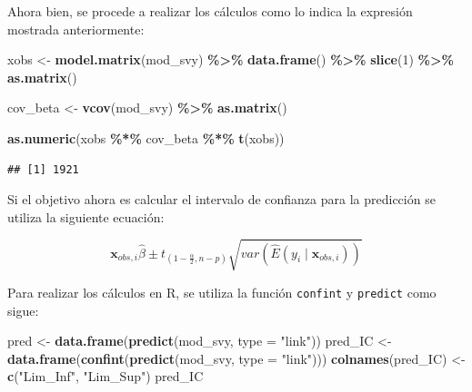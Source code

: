 \documentclass[
  12pt,
]{book}
\newenvironment{Shaded}{\begin{snugshade}}{\end{snugshade}}
\newcommand{\AttributeTok}[1]{\textcolor[rgb]{0.13,0.29,0.53}{#1}}
\newcommand{\DecValTok}[1]{\textcolor[rgb]{0.00,0.00,0.81}{#1}}
\newcommand{\FunctionTok}[1]{\textcolor[rgb]{0.13,0.29,0.53}{\textbf{#1}}}
\newcommand{\NormalTok}[1]{#1}
\newcommand{\OtherTok}[1]{\textcolor[rgb]{0.56,0.35,0.01}{#1}}
\newcommand{\SpecialCharTok}[1]{\textcolor[rgb]{0.81,0.36,0.00}{\textbf{#1}}}
\newcommand{\StringTok}[1]{\textcolor[rgb]{0.31,0.60,0.02}{#1}}
\begin{document}
Ahora bien, se procede a realizar los cálculos como lo indica la expresión mostrada anteriormente:

\begin{Shaded}
\begin{Highlighting}[]
\NormalTok{xobs }\OtherTok{\textless{}{-}} \FunctionTok{model.matrix}\NormalTok{(mod\_svy) }\SpecialCharTok{\%\textgreater{}\%}
        \FunctionTok{data.frame}\NormalTok{() }\SpecialCharTok{\%\textgreater{}\%} \FunctionTok{slice}\NormalTok{(}\DecValTok{1}\NormalTok{) }\SpecialCharTok{\%\textgreater{}\%} \FunctionTok{as.matrix}\NormalTok{()}

\NormalTok{cov\_beta }\OtherTok{\textless{}{-}} \FunctionTok{vcov}\NormalTok{(mod\_svy) }\SpecialCharTok{\%\textgreater{}\%} \FunctionTok{as.matrix}\NormalTok{()}

\FunctionTok{as.numeric}\NormalTok{(xobs }\SpecialCharTok{\%*\%}\NormalTok{ cov\_beta }\SpecialCharTok{\%*\%} \FunctionTok{t}\NormalTok{(xobs))}
\end{Highlighting}
\end{Shaded}

\begin{verbatim}
## [1] 1921
\end{verbatim}

Si el objetivo ahora es calcular el intervalo de confianza para la predicción se utiliza la siguiente ecuación:

\[
\boldsymbol{x}_{obs,i}\hat{\beta}\pm t_{\left(1-\frac{\alpha}{2},n-p\right)}\sqrt{var\left(\hat{E}\left(y_{i}\mid\boldsymbol{x}_{obs,i}\right)\right)}
\]

Para realizar los cálculos en R, se utiliza la función \texttt{confint} y \texttt{predict} como sigue:

\begin{Shaded}
\begin{Highlighting}[]
\NormalTok{pred }\OtherTok{\textless{}{-}} \FunctionTok{data.frame}\NormalTok{(}\FunctionTok{predict}\NormalTok{(mod\_svy, }\AttributeTok{type =} \StringTok{"link"}\NormalTok{))}
\NormalTok{pred\_IC }\OtherTok{\textless{}{-}} \FunctionTok{data.frame}\NormalTok{(}\FunctionTok{confint}\NormalTok{(}\FunctionTok{predict}\NormalTok{(mod\_svy, }\AttributeTok{type =} \StringTok{"link"}\NormalTok{)))}
\FunctionTok{colnames}\NormalTok{(pred\_IC) }\OtherTok{\textless{}{-}} \FunctionTok{c}\NormalTok{(}\StringTok{"Lim\_Inf"}\NormalTok{, }\StringTok{"Lim\_Sup"}\NormalTok{)}
\NormalTok{pred\_IC}
\end{Highlighting}
\end{Shaded}
\end{document}
